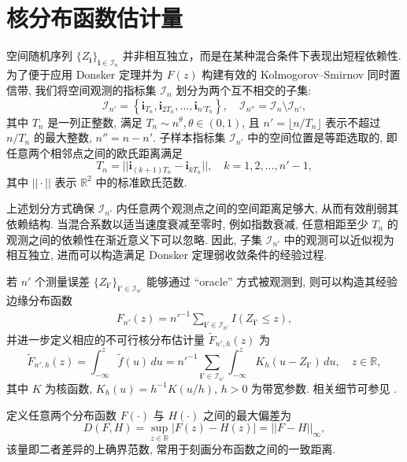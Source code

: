 \documentclass[a4paper,openay,14pt]{ctexbook}
\numberwithin{equation}{section}
\numberwithin{lem}{section}
\begin{document}
\section{核分布函数估计量}\label{KDE}
空间随机序列 $\{Z_{\mathbf{i}}\}_{\mathbf{i} \in \mathcal{I}_n}$ 并非相互独立，而是在某种混合条件下表现出短程依赖性. 为了便于应用 Donsker 定理并为 $F(z)$ 构建有效的 Kolmogorov--Smirnov 同时置信带, 我们将空间观测的指标集 $\mathcal{I}_n$ 划分为两个互不相交的子集:
\[
\mathcal{I}_{n'} = \left\{ \mathbf{i}_{T_n}, \mathbf{i}_{2T_n}, \ldots, \mathbf{i}_{n' T_n} \right\}, 
\quad 
\mathcal{I}_{n''} = \mathcal{I}_n \setminus \mathcal{I}_{n'},
\]
其中 $T_n$ 是一列正整数, 满足 $T_n \sim n^{\theta}, \theta \in (0,1)$, 且 $n' = \lfloor n / T_n \rfloor$ 表示不超过 $n/T_n$ 的最大整数, $n'' = n - n'$. 子样本指标集 $\mathcal{I}_{n'}$ 中的空间位置是等距选取的, 即任意两个相邻点之间的欧氏距离满足
\[
T_n = ||\mathbf{i}_{(k+1)T_n} - \mathbf{i}_{kT_n}||, \quad k = 1,2,\dots,n'-1,
\]
其中 $||\cdot||$ 表示 $\mathbb{R}^2$ 中的标准欧氏范数.

上述划分方式确保 $\mathcal{I}_{n'}$ 内任意两个观测点之间的空间距离足够大, 从而有效削弱其依赖结构. 当混合系数以适当速度衰减至零时, 例如指数衰减, 任意相距至少 $T_n$ 的观测之间的依赖性在渐近意义下可以忽略. 因此, 子集 $\mathcal{I}_{n'}$ 中的观测可以近似视为相互独立, 进而可以构造满足 Donsker 定理弱收敛条件的经验过程.

若 $n'$ 个测量误差 $\{Z_{\mathbf{i}'}\}_{\mathbf{i}' \in \mathcal{I}_{n'}}$ 能够通过 ``oracle'' 方式被观测到, 则可以构造其经验边缘分布函数
\begin{align*}
F_{n'}(z) = n'^{-1} \sum_{\mathbf{i}' \in \mathcal{I}_{n'}} I\left(Z_{\mathbf{i}'} \le z\right),
\end{align*}
并进一步定义相应的不可行核分布估计量 $\tilde{F}_{n',h}(z)$ 为
\begin{equation}\label{EQ:Fn'tilde}
\tilde{F}_{n',h}(z)
= \int_{-\infty}^{z} \tilde{f}(u) \, du
= n'^{-1} \sum_{\mathbf{i}' \in \mathcal{I}_{n'}}
\int_{-\infty}^{z} K_h(u - Z_{\mathbf{i}'}) \, du, 
\quad z \in \mathbb{R},
\end{equation}
其中 $K$ 为核函数, $K_h(u) = h^{-1} K(u/h)$, $h>0$ 为带宽参数. 相关细节可参见 \cite{wang2013smooth}.

定义任意两个分布函数 $F(\cdot)$ 与 $H(\cdot)$ 之间的最大偏差为
\begin{equation}\label{EQ:D(F,H)}
D(F,H) = \sup_{z \in \mathbb{R}} |F(z) - H(z)| = ||F - H||_{\infty},
\end{equation}
该量即二者差异的上确界范数, 常用于刻画分布函数之间的一致距离.
\end{document}

